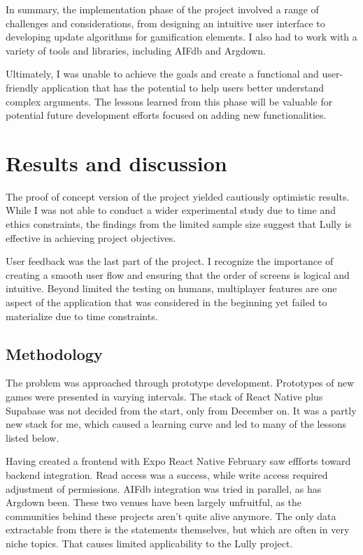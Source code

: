 \documentclass{article}
\begin{document}
In summary, the implementation phase of the project involved a range of challenges and considerations, from designing an intuitive user interface to developing update algorithms for gamification elements. I also had to work with a variety of tools and libraries, including AIFdb and Argdown. 

Ultimately, I was unable to achieve the goals and create a functional and user-friendly application that has the potential to help users better understand complex arguments. The lessons learned from this phase will be valuable for potential future development efforts focused on adding new functionalities.

\newpage

\chapter{Results and discussion}

The proof of concept version of the  project yielded cautiously optimistic results. While I was not able to conduct a wider experimental study due to time and ethics constraints, the findings from the limited sample size suggest that Lully is effective in achieving project objectives. 

User feedback was the last part of the project. I recognize the importance of creating a smooth user flow and ensuring that the order of screens is logical and intuitive. Beyond limited the testing on humans, multiplayer features are one aspect of the application that was considered in the beginning yet failed to materialize due to time constraints. 

\section{Methodology}
The problem was approached through prototype development. Prototypes of new games were presented in varying intervals. The stack of React Native plus Supabase was not decided from the start, only from December on. It was a partly new stack for me, which caused a learning curve and led to many of the lessons listed below.

Having created a frontend with Expo React Native February saw effforts toward backend integration. Read access was a success, while write access required adjustment of permissions. AIFdb integration was tried in parallel, as has Argdown been. These two venues have been largely unfruitful, as the communities behind these projects aren't quite alive anymore. The only data extractable from there is the statements themselves, but which are often in very niche topics. That causes limited applicability to the Lully project. 
\end{document}
